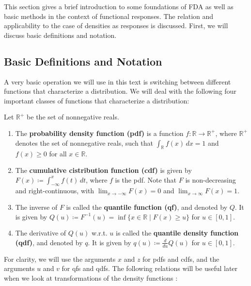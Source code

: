 This section gives a brief introduction to some foundations of FDA as well as basic
methods in the context of functional responses. The relation and applicability to the
case of densities as responses is discussed. First, we will discuss basic definitions
and notation.

\subsection{Basic Definitions and Notation}
\label{sec:basics}
A very basic operation we will use in this text is switching between different functions
that characterize a distribution. We will deal with the following four important classes
of functions that characterize a distribution:

\begin{definition}
    Let \(\mathbb{R}^+\) be the set of nonnegative reals.
    \begin{enumerate}
        \item The \textbf{probability density function (pdf)} is a function
        \( f: \mathbb{R} \to \mathbb{R}^+ \), where \(\mathbb{R}^+\) denotes the set of
        nonnegative reals, such that \( \int_{\mathbb{R}} f(x) \, dx = 1 \)
        and \( f(x) \geq 0 \) for all \( x \in \mathbb{R} \).

        \item The \textbf{cumulative cistribution function (cdf)} is given by
        \( F(x) \coloneqq \int_{-\infty}^{x} f(t) \, dt \), where \( f \) is the pdf.
        Note that \( F\) is non-decreasing and right-continuous,
        with \( \lim_{{x \to -\infty}} F(x) = 0 \) and \( \lim_{{x \to \infty}} F(x) = 1 \).

        \item The inverse of \(F\) is called the \textbf{quantile function (qf)},
        and denoted by \(Q\). It is given by \( Q(u) \coloneqq F^{-1}(u) =
        \inf \{ x \in \mathbb{R} \mid F(x) \geq u \} \) for \( u \in [0, 1] \).

        \item The derivative of \(Q(u)\) w.r.t. \(u\) is called the \textbf{quantile
        density function (qdf)}, and denoted by \(q\). It is given by
        \(q(u) \coloneqq \frac{d}{du} Q(u)\) for \( u \in [0, 1] \).
    \end{enumerate}
\end{definition}

For clarity, we will use the arguments $x$ and $z$ for pdfs and cdfs, and the arguments
$u$ and $v$ for qfs and qdfs.
The following relations will be useful later when we look at transformations of the
density functions \parencite[cf.][]{JONES1992}:

